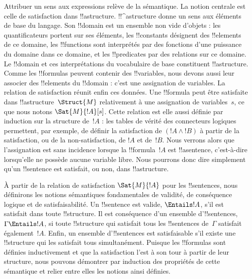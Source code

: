 \documentclass[../../../include/open-logic-section]{subfiles}
\begin{document}


Attribuer un sens aux expressions relève de la sémantique. La notion
centrale est celle de satisfaction dans !!a{structure}. !!^a{structure}
donne un sens aux éléments de base du langage. Son !!{domain} est
un ensemble non vide d'objets : les quantificateurs portent sur ses
éléments, les !!{constant}s désignent des !!{element}s de ce domaine,
les !!{function}s sont interprétés par des fonctions d'une puissance
du domaine dans ce domaine, et les !!{predicate}s par des relations sur ce domaine.
Le !!{domain} et ces interprétations du vocabulaire de base constituent
!!a{structure}. Comme les !!{formula}s peuvent contenir des
!!{variable}s, nous devons aussi leur associer des !!{element}s du
!!{domain} : c'est une assignation de variables. La relation de
satisfaction réunit enfin ces données. Une !!{formula} peut être
satisfaite dans !!a{structure}~$\Struct{M}$ relativement à une
assignation de variables~$s$, ce que nous notons $\Sat{M}{!A}[s]$.
Cette relation est elle aussi définie par induction sur la structure
de~$!A$ : les tables de vérité des connecteurs logiques permettent,
par exemple, de définir la satisfaction de $(!A \land !B)$ à partir
de la satisfaction, ou de la non-satisfaction, de $!A$ et de~$!B$.
Nous verrons alors que l'assignation est sans incidence lorsque la
!!{formula}~$!A$ est !!a{sentence}, c'est-à-dire lorsqu'elle ne
possède aucune variable libre. Nous pourrons donc dire simplement
qu'un !!{sentence} est satisfait, ou non, dans !!a{structure}.

À partir de la relation de satisfaction $\Sat{M}{!A}$ pour les
!!{sentence}s, nous définirons les notions sémantiques fondamentales
de validité, de conséquence logique et de satisfaisabilité. Un
!!{sentence} est valide, $\Entails !A$, s'il est satisfait dans
toute !!{structure}. Il est conséquence d'un ensemble d'!!{sentence}s,
$\Gamma \Entails !A$, si toute !!{structure} qui satisfait tous les
!!{sentence}s de~$\Gamma$ satisfait également~$!A$. Enfin, un
ensemble d'!!{sentence}s est satisfaisable s'il existe une
!!{structure} qui les satisfait tous simultanément. Puisque les
!!{formula}s sont définies inductivement et que la satisfaction
l'est à son tour à partir de leur structure, nous pouvons démontrer
par induction des propriétés de cette sémantique et relier entre elles
les notions ainsi définies.
\end{document}
